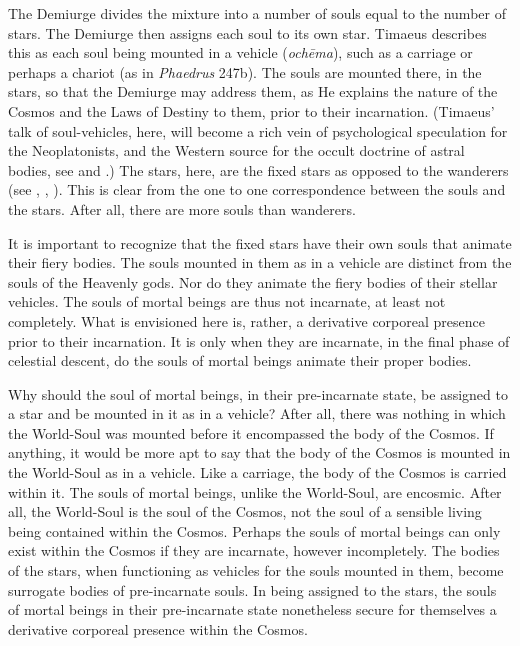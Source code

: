 The Demiurge divides the mixture into a number of souls equal to the number of stars. The Demiurge then assigns each soul to its own star. Timaeus describes this as each soul being mounted in a vehicle (\emph{ochēma}), such as a carriage or perhaps a chariot (as in \emph{Phaedrus} 247b). The souls are mounted there, in the stars, so that the Demiurge may address them, as He explains the nature of the Cosmos and the Laws of Destiny to them, prior to their incarnation. (Timaeus' talk of soul-vehicles, here, will become a rich vein of psychological speculation for the Neoplatonists, and the Western source for the occult doctrine of astral bodies, see \citealt[appendix 2]{Dodds:1963ul} and \citealt{Finamore:1985aa}.) The stars, here, are the fixed stars as opposed to the wanderers  (see \citealt[141--2 n13]{Archer-Hind:1888qd}, \citealt[255--6]{Taylor:1928qb}, \citealt[143]{Cornford:1935fk}). This is clear from the one to one correspondence between the souls and the stars. After all, there are more souls than wanderers.

It is important to recognize that the fixed stars have their own souls that animate their fiery bodies. The souls mounted in them as in a vehicle are distinct from the souls of the Heavenly gods. Nor do they animate the fiery bodies of their stellar vehicles. The souls of mortal beings are thus not incarnate, at least not completely. What is envisioned here is, rather, a derivative corporeal presence prior to their incarnation. It is only when they are incarnate, in the final phase of celestial descent, do the souls of mortal beings animate their proper bodies.

Why should the soul of mortal beings, in their pre-incarnate state, be assigned to a star and be mounted in it as in a vehicle? After all, there was nothing in which the World-Soul was mounted before it encompassed the body of the Cosmos. If anything, it would be more apt to say that the body of the Cosmos is mounted in the World-Soul as in a vehicle. Like a carriage, the body of the Cosmos is carried within it. The souls of mortal beings, unlike the World-Soul, are encosmic. After all, the World-Soul is the soul of the Cosmos, not the soul of a sensible living being contained within the Cosmos. Perhaps the souls of mortal beings can only exist within the Cosmos if they are incarnate, however incompletely. The bodies of the stars, when functioning as vehicles for the souls mounted in them, become surrogate bodies of pre-incarnate souls. In being assigned to the stars, the souls of mortal beings in their pre-incarnate state nonetheless secure for themselves a derivative corporeal presence within the Cosmos. 

